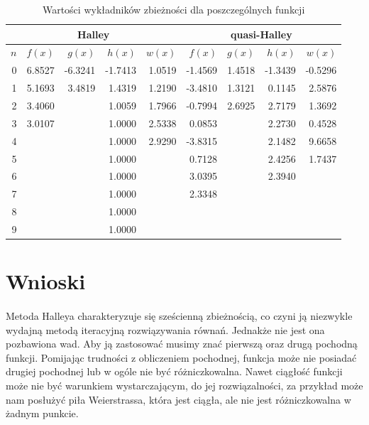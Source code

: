 \documentclass{article}
\begin{document}
    \begin{table}[htb]
      \centering
      \caption{Wartości wykładników zbieżności dla poszczególnych funkcji}
      \label{tab:convergence}
      \begin{tabular}{|r||r|r|r|r||r|r|r|r|}
        \hline
        \multicolumn{5}{|c||}{Halley}              & \multicolumn{4}{|c|}{quasi-Halley}   \\ \hline \hline
        $n$ & $f(x)$ & $g(x)$  & $h(x)$  & $w(x)$ & $f(x)$  & $g(x)$ & $h(x)$  & $w(x)$  \\ \hline
        0   & 6.8527 & -6.3241 & -1.7413 & 1.0519 & -1.4569 & 1.4518 & -1.3439 & -0.5296 \\
        1   & 5.1693 &  3.4819 &  1.4319 & 1.2190 & -3.4810 & 1.3121 &  0.1145 &  2.5876 \\
        2   & 3.4060 &         &  1.0059 & 1.7966 & -0.7994 & 2.6925 &  2.7179 &  1.3692 \\
        3   & 3.0107 &         &  1.0000 & 2.5338 &  0.0853 &        &  2.2730 &  0.4528 \\
        4   &        &         &  1.0000 & 2.9290 & -3.8315 &        &  2.1482 &  9.6658 \\
        5   &        &         &  1.0000 &        &  0.7128 &        &  2.4256 &  1.7437 \\
        6   &        &         &  1.0000 &        &  3.0395 &        &  2.3940 &         \\
        7   &        &         &  1.0000 &        &  2.3348 &        &         &         \\
        8   &        &         &  1.0000 &        &         &        &         &         \\
        9   &        &         &  1.0000 &        &         &        &         &         \\
        \hline
      \end{tabular}
    \end{table}


  \section{Wnioski}

    \paragraph{} Metoda Halleya charakteryzuje się sześcienną zbieżnością, co czyni
    ją niezwykle wydajną metodą iteracyjną rozwiązywania równań. Jednakże nie jest
    ona pozbawiona wad. Aby ją zastosować musimy znać pierwszą oraz drugą pochodną
    funkcji. Pomijając trudności z obliczeniem pochodnej, funkcja może nie posiadać
    drugiej pochodnej lub w ogóle nie być różniczkowalna. Nawet ciągłość funkcji
    może nie być warunkiem wystarczającym, do jej rozwiązalności, za przykład może
    nam posłużyć piła Weierstrassa, która jest ciągła, ale nie jest różniczkowalna
    w żadnym punkcie.
\end{document}

